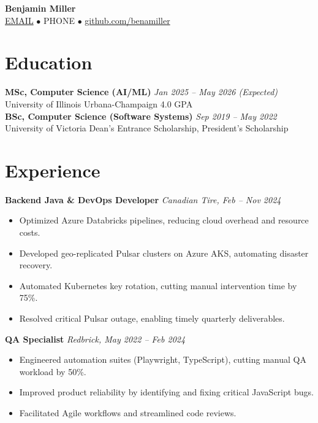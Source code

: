 \documentclass[10pt]{article}
\begin{document}
\begin{center}
    {\Huge\textbf{Benjamin Miller}}\\
    \vspace{1mm}
    \href{mailto:EMAIL}{EMAIL} $\bullet$ PHONE $\bullet$
    \href{https://github.com/benamiller}{github.com/benamiller}
\end{center}

\section*{Education}
\textbf{MSc, Computer Science (AI/ML)} \hfill \textit{Jan 2025 -- May 2026 (Expected)}\\
University of Illinois Urbana-Champaign \hfill 4.0 GPA\\
\textbf{BSc, Computer Science (Software Systems)} \hfill \textit{Sep 2019 -- May 2022}\\
University of Victoria \hfill Dean's Entrance Scholarship, President’s Scholarship

\section*{Experience}
\textbf{Backend Java \& DevOps Developer} \hfill \textit{Canadian Tire, Feb -- Nov 2024}
\begin{itemize}[leftmargin=0.25in, itemsep=0pt]
    \item Optimized Azure Databricks pipelines, reducing cloud overhead and resource costs.
    \item Developed geo-replicated Pulsar clusters on Azure AKS, automating disaster recovery.
    \item Automated Kubernetes key rotation, cutting manual intervention time by 75\%.
    \item Resolved critical Pulsar outage, enabling timely quarterly deliverables.
\end{itemize}

\textbf{QA Specialist} \hfill \textit{Redbrick, May 2022 -- Feb 2024}
\begin{itemize}[leftmargin=0.25in, itemsep=0pt]
    \item Engineered automation suites (Playwright, TypeScript), cutting manual QA workload by 50\%.
    \item Improved product reliability by identifying and fixing critical JavaScript bugs.
    \item Facilitated Agile workflows and streamlined code reviews.
\end{itemize}
\end{document}

